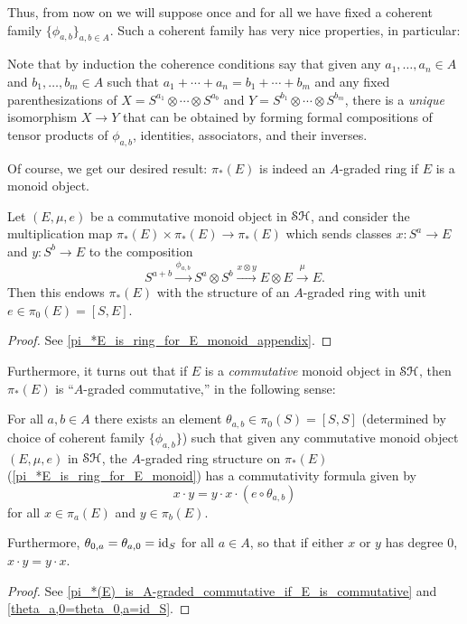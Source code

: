 \documentclass[../main.tex]{subfiles}
\begin{document}
Thus, from now on we will suppose once and for all we have fixed a coherent family $\{\phi_{a,b}\}_{a,b\in A}$. Such a coherent family has very nice properties, in particular:

\begin{remark}\label{unique_comp_Sas}
	Note that by induction the coherence conditions say that given any $a_1,\ldots,a_n\in A$ and $b_1,\ldots,b_m\in A$ such that $a_1+\cdots+a_n=b_1+\cdots+b_m$ and any fixed parenthesizations of $X=S^{a_1}\otimes\cdots\otimes S^{a_b}$ and $Y=S^{b_1}\otimes\cdots\otimes S^{b_m}$, there is a \emph{unique} isomorphism $X\to Y$ that can be obtained by forming formal compositions of tensor products of $\phi_{a,b}$, identities, associators, and their inverses.
\end{remark}

Of course, we get our desired result: $\pi_*(E)$ is indeed an $A$-graded ring if $E$ is a monoid object.

\begin{proposition}\label{pi_*E_is_ring_for_E_monoid}
	Let $(E,\mu,e)$ be a commutative monoid object in $\mathcal{SH}$, and consider the multiplication map $\pi_*(E)\times\pi_*(E)\to\pi_*(E)$ which sends classes $x:S^a\to E$ and $y:S^b\to E$ to the composition
	\[S^{a+b}\xrightarrow{\phi_{a,b}}S^a\otimes S^b\xrightarrow{x\otimes y}E\otimes E\xrightarrow\mu E.\]
	Then this endows $\pi_*(E)$ with the structure of an $A$-graded ring with unit $e\in\pi_0(E)=[S,E]$.
\end{proposition}
\begin{proof}
	See \autoref{pi_*E_is_ring_for_E_monoid_appendix}. 
\end{proof}

Furthermore, it turns out that if $E$ is a \emph{commutative} monoid object in $\mathcal{SH}$, then $\pi_\ast(E)$ is ``$A$-graded commutative,'' in the following sense:

\begin{proposition}
	For all $a,b\in A$ there exists an element $\theta_{a,b}\in\pi_0(S)=[S,S]$ (determined by choice of coherent family $\{\phi_{a,b}\}$) such that given any commutative monoid object $(E,\mu,e)$ in $\mathcal{SH}$, the $A$-graded ring structure on $\pi_\ast(E)$ (\autoref{pi_*E_is_ring_for_E_monoid}) has a commutativity formula given by
	\[x\cdot y=y\cdot x\cdot (e\circ\theta_{a,b})\]
	for all $x\in\pi_a(E)$ and $y\in\pi_b(E)$.
	
	Furthermore, $\theta_{0,a}=\theta_{a,0}=\mathrm{id}_S$ for all $a\in A$, so that if either $x$ or $y$ has degree $0$, $x\cdot y=y\cdot x$.
\end{proposition}
\begin{proof}
	See \autoref{pi_*(E)_is_A-graded_commutative_if_E_is_commutative} and \autoref{theta_a,0=theta_0,a=id_S}.
\end{proof}
\end{document}
